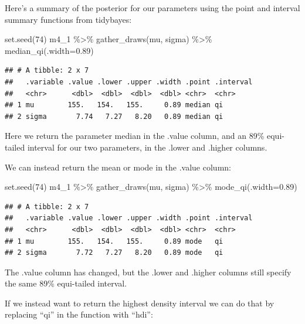\documentclass[
]{book}
\newenvironment{Shaded}{\begin{snugshade}}{\end{snugshade}}
\newcommand{\AttributeTok}[1]{\textcolor[rgb]{0.77,0.63,0.00}{#1}}
\newcommand{\DecValTok}[1]{\textcolor[rgb]{0.00,0.00,0.81}{#1}}
\newcommand{\FloatTok}[1]{\textcolor[rgb]{0.00,0.00,0.81}{#1}}
\newcommand{\FunctionTok}[1]{\textcolor[rgb]{0.00,0.00,0.00}{#1}}
\newcommand{\NormalTok}[1]{#1}
\newcommand{\SpecialCharTok}[1]{\textcolor[rgb]{0.00,0.00,0.00}{#1}}
\begin{document}
Here's a summary of the posterior for our parameters using the point and interval summary functions from tidybayes:

\begin{Shaded}
\begin{Highlighting}[]
\FunctionTok{set.seed}\NormalTok{(}\DecValTok{74}\NormalTok{)}
\NormalTok{m4\_1 }\SpecialCharTok{\%\textgreater{}\%}
  \FunctionTok{gather\_draws}\NormalTok{(mu, sigma) }\SpecialCharTok{\%\textgreater{}\%}
  \FunctionTok{median\_qi}\NormalTok{(}\AttributeTok{.width=}\FloatTok{0.89}\NormalTok{)}
\end{Highlighting}
\end{Shaded}

\begin{verbatim}
## # A tibble: 2 x 7
##   .variable .value .lower .upper .width .point .interval
##   <chr>      <dbl>  <dbl>  <dbl>  <dbl> <chr>  <chr>    
## 1 mu        155.   154.   155.     0.89 median qi       
## 2 sigma       7.74   7.27   8.20   0.89 median qi
\end{verbatim}

Here we return the parameter median in the .value column, and an 89\% equi-tailed interval for our two parameters, in the .lower and .higher columns.

We can instead return the mean or mode in the .value column:

\begin{Shaded}
\begin{Highlighting}[]
\FunctionTok{set.seed}\NormalTok{(}\DecValTok{74}\NormalTok{)}
\NormalTok{m4\_1 }\SpecialCharTok{\%\textgreater{}\%}
  \FunctionTok{gather\_draws}\NormalTok{(mu, sigma) }\SpecialCharTok{\%\textgreater{}\%}
  \FunctionTok{mode\_qi}\NormalTok{(}\AttributeTok{.width=}\FloatTok{0.89}\NormalTok{)}
\end{Highlighting}
\end{Shaded}

\begin{verbatim}
## # A tibble: 2 x 7
##   .variable .value .lower .upper .width .point .interval
##   <chr>      <dbl>  <dbl>  <dbl>  <dbl> <chr>  <chr>    
## 1 mu        155.   154.   155.     0.89 mode   qi       
## 2 sigma       7.72   7.27   8.20   0.89 mode   qi
\end{verbatim}

The .value column has changed, but the .lower and .higher columns still specify the same 89\% equi-tailed interval.

If we instead want to return the highest density interval we can do that by replacing ``qi'' in the function with ``hdi'':
\end{document}
